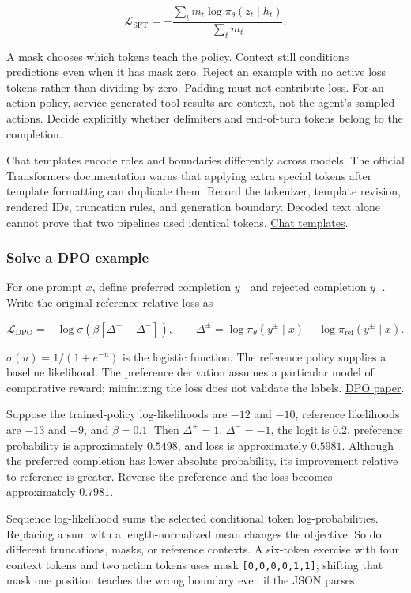 \documentclass[
  11pt,
  letterpaper,
]{article}
\begin{document}
\[\mathcal L_{\mathrm{SFT}}=-\frac{\sum_t m_t\log\pi_\theta(z_t\mid h_t)}{\sum_t m_t}.\]

A mask chooses which tokens teach the policy. Context still conditions
predictions even when it has mask zero. Reject an example with no active
loss tokens rather than dividing by zero. Padding must not contribute
loss. For an action policy, service-generated tool results are context,
not the agent's sampled actions. Decide explicitly whether delimiters
and end-of-turn tokens belong to the completion.

Chat templates encode roles and boundaries differently across models.
The official Transformers documentation warns that applying extra
special tokens after template formatting can duplicate them. Record the
tokenizer, template revision, rendered IDs, truncation rules, and
generation boundary. Decoded text alone cannot prove that two pipelines
used identical tokens.
\href{https://huggingface.co/docs/transformers/main/en/chat_templating}{Chat
templates}.

\subsubsection{Solve a DPO example}\label{solve-a-dpo-example}

For one prompt \(x\), define preferred completion \(y^+\) and rejected
completion \(y^-\). Write the original reference-relative loss as

\[\mathcal L_{\mathrm{DPO}}=-\log\sigma\!\left(\beta[\Delta^+-\Delta^-]\right),\qquad
\Delta^\pm=\log\pi_\theta(y^\pm\mid x)-\log\pi_{\mathrm{ref}}(y^\pm\mid x).\]

\(\sigma(u)=1/(1+e^{-u})\) is the logistic function. The reference
policy supplies a baseline likelihood. The preference derivation assumes
a particular model of comparative reward; minimizing the loss does not
validate the labels. \href{https://arxiv.org/html/2305.18290v3}{DPO
paper}.

Suppose the trained-policy log-likelihoods are \(-12\) and \(-10\),
reference likelihoods are \(-13\) and \(-9\), and \(\beta=0.1\). Then
\(\Delta^+=1\), \(\Delta^-=-1\), the logit is \(0.2\), preference
probability is approximately \(0.5498\), and loss is approximately
\(0.5981\). Although the preferred completion has lower absolute
probability, its improvement relative to reference is greater. Reverse
the preference and the loss becomes approximately \(0.7981\).

Sequence log-likelihood sums the selected conditional token
log-probabilities. Replacing a sum with a length-normalized mean changes
the objective. So do different truncations, masks, or reference
contexts. A six-token exercise with four context tokens and two action
tokens uses mask \texttt{{[}0,0,0,0,1,1{]}}; shifting that mask one
position teaches the wrong boundary even if the JSON parses.
\end{document}
